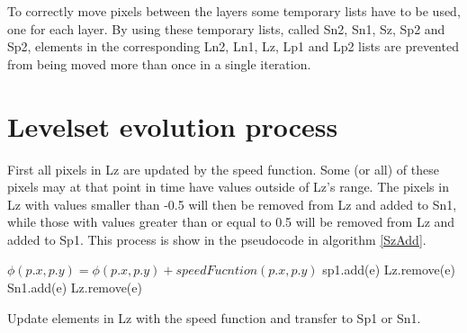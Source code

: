 To correctly move pixels between the layers some temporary lists have to be used, one for each layer. By using these temporary lists, called Sn2, Sn1, Sz, Sp2 and Sp2, elements in the corresponding Ln2, Ln1, Lz, Lp1 and Lp2 lists are prevented from being moved more than once in a single iteration.

\section{Levelset evolution process}
First all pixels in Lz are updated by the speed function. Some (or all) of these pixels may at that point in time have values outside of Lz's range. The pixels in Lz with values smaller than -0.5 will then be removed from Lz and added to Sn1, while those with values greater than or equal to 0.5 will be removed from Lz and added to Sp1. This process is show in the pseudocode in algorithm \ref{SzAdd}.
\begin{algorithm}[h!]
\begin{algorithmic}[1] %
 
	\State $\phi(p.x, p.y) = \phi(p.x, p.y) + speedFucntion(p.x, p.y)$ 
		\State sp1.add(e)
		\State Lz.remove(e)
		\State Sn1.add(e)
		\State Lz.remove(e)
	\EndIf
\EndFor
\end{algorithmic}
\caption{Update elements in Lz with the speed function and transfer to Sp1 or Sn1.}
\label{SzAdd}
\end{algorithm}
